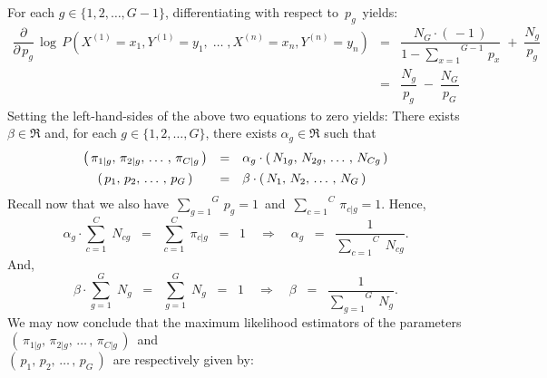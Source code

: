 \begin{enumerate}
	For each $g \in \{1,2,\ldots,G-1\}$, differentiating with respect to \,$p_{g}$\, yields:
	\begin{eqnarray*}
	\dfrac{\partial}{\partial\,p_{g}}\,
	\log\,P\!\left(X^{(1)} = x_{1},Y^{(1)}=y_{1}, \;\ldots\; ,X^{(n)} = x_{n},Y^{(n)}=y_{n}\right)
	&=&
		\dfrac{N_{G}\cdot(\,-1\,)}{1 - \overset{G-1}{\underset{x=1}{\sum}}\,p_{x}}
		\; + \;
		\dfrac{N_{g}}{p_{g}}
	\\
	&=&
		\dfrac{N_{g}}{p_{g}}
		\; - \;
		\dfrac{N_{G}}{p_{G}}
	\end{eqnarray*}
	Setting the left-hand-sides of the above two equations to zero yields:
	There exists $\beta \in \Re$ and, 
	for each $g \in \{1,2,\ldots,G\}$, there exists $\alpha_{g} \in \Re$ such that
	\begin{equation*}
		\begin{array}{ccl}
		\left(\,\pi_{1\vert g},\,\pi_{2\vert g}, \,\ldots\,, \,\pi_{C\vert g}\,\right)
		& = & \alpha_{g} \cdot \left(\,N_{1g},\,N_{2g}, \,\ldots\,,\, N_{Cg}\,\right)
		\\
		\left(\,p_{1},\,p_{2}, \,\ldots\,, \,p_{G}\,\right)
		& \overset{{\color{white}\vert}}{=} & \beta \cdot \left(\,N_{1},\, N_{2}, \,\ldots\,,\, N_{G}\,\right)
		\end{array}
	\end{equation*}
	Recall now that we also have
	\,$\overset{G}{\underset{g=1}{\sum}}\,p_{g} = 1$\, and
	\,$\overset{C}{\underset{c=1}{\sum}}\,\pi_{c\vert g} = 1$.
	Hence,
	\begin{equation*}
	\alpha_{g} \cdot \overset{C}{\underset{c=1}{\sum}}\;N_{cg}
	\;\; = \;\; \overset{C}{\underset{c=1}{\sum}}\;\pi_{c\vert g}
	\;\; = \;\; 1
	\quad\Longrightarrow\quad
	\alpha_{g} \;\;=\;\; \dfrac{1}{\overset{C}{\underset{c=1}{\sum}}\;N_{cg}}.
	\end{equation*}
	And,
	\begin{equation*}
	\beta \cdot \overset{G}{\underset{g=1}{\sum}}\;N_{g}
	\;\; = \;\; \overset{G}{\underset{g=1}{\sum}}\;N_{g}
	\;\; = \;\; 1
	\quad\Longrightarrow\quad
	\beta \;\;=\;\; \dfrac{1}{\overset{G}{\underset{g=1}{\sum}}\;N_{g}}.
	\end{equation*}
	We may now conclude that the maximum likelihood estimators of the parameters
	\,$\left(\,\pi_{1\vert g},\,\pi_{2\vert g}, \,\ldots\,, \,\pi_{C\vert g}\,\right)$\,
	and\\
	$\left(\,p_{1},\,p_{2}, \,\ldots\,, \,p_{G}\,\right)$\,
	are respectively given by:
	\begin{equation*}
		\begin{array}{ccccc}

\end{array}
\end{equation*}
\end{enumerate}
